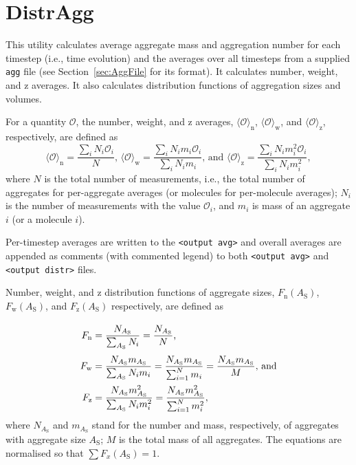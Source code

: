 \section{DistrAgg} \label{sec:DistrAgg}

This utility calculates average aggregate mass and aggregation number for
each timestep (i.e., time evolution) and the averages over all timesteps
from a supplied \texttt{agg} file (see Section~\ref{sec:AggFile} for its format).
It calculates number, weight, and z averages. It also calculates
distribution functions of aggregation sizes and volumes.

For a quantity $\mathcal{O}$, the number, weight, and z averages,
$\langle\mathcal{O}\rangle_{\mathrm{n}}$,
$\langle\mathcal{O}\rangle_{\mathrm{w}}$, and
$\langle\mathcal{O}\rangle_{\mathrm{z}}$, respectively, are defined as
\begin{equation} \label{eq:Avg}
  \langle\mathcal{O}\rangle_{\mathrm{n}} = \frac{\sum_i N_i\mathcal{O}_i     }{N}
  \mbox{, \ \ \ }
  \langle\mathcal{O}\rangle_{\mathrm{w}} = \frac{\sum_i N_im_i\mathcal{O}_i  }{\sum_i N_i m_i}
  \mbox{, and \ \ \ }
  \langle\mathcal{O}\rangle_{\mathrm{z}} = \frac{\sum_i N_im_i^2\mathcal{O}_i}{\sum_i N_i m_i^2},
\end{equation}
where $N$ is the total number of measurements, i.e., the total number of
aggregates for per-aggregate averages (or molecules for per-molecule
averages); $N_i$ is the number of measurements with the value
$\mathcal{O}_i$, and $m_i$ is mass of an aggregate $i$ (or a molecule $i$).

Per-timestep averages are written to the \texttt{<output avg>} and overall
averages are appended as comments (with commented legend) to both
\texttt{<output avg>} and \texttt{<output distr>} files.

Number, weight, and z distribution functions of aggregate sizes,
$F_{\mathrm{n}}(A_{\mathrm{S}})$, $F_{\mathrm{w}}(A_{\mathrm{S}})$, and
$F_{\mathrm{z}}(A_{\mathrm{S}})$ respectively, are defined as
\begin{equation} \label{eq:Fnwz}
  \arraycolsep=1.4pt\def\arraystretch{2.5}
  \begin{array}{>{\displaystyle}rc>{\displaystyle}l}
    F_{\mathrm{n}} & = & \frac{N_{A_{\mathrm{S}} }}{\sum_{A_{\mathrm{S}} } N_i} =
    \frac{N_{A_{\mathrm{S}} }}{N}
  \mbox{,} \\
    F_{\mathrm{w}} & = & \frac{N_{A_{\mathrm{S}} } m_{A_{\mathrm{S}} }}{\sum_{A_{\mathrm{S}} } N_i m_i} =
    \frac{N_{A_{\mathrm{S}} } m_{A_{\mathrm{S}} }}{\sum_{i=1}^N m_i} =
    \frac{N_{A_{\mathrm{S}} } m_{A_{\mathrm{S}} }}{M}
  \mbox{, and} \\
    F_{\mathrm{z}} & = & \frac{N_{A_{\mathrm{S}} } m^2_{A_{\mathrm{S}}
    }}{\sum_{A_{\mathrm{S}} } N_i m_i^2} =
    \frac{N_{A_{\mathrm{S}} } m^2_{A_{\mathrm{S}} }}{\sum_{i=1}^N m_i^2}, \\
  \end{array}
\end{equation}
where $N_{A_{\mathrm{S}}}$ and $m_{A_{\mathrm{S}}}$ stand for the number
and mass, respectively, of aggregates with aggregate size $A_{\mathrm{S}}$;
$M$ is the total mass of all aggregates. The equations are normalised so
that $\sum F_x(A_{\mathrm{S}})=1$.

